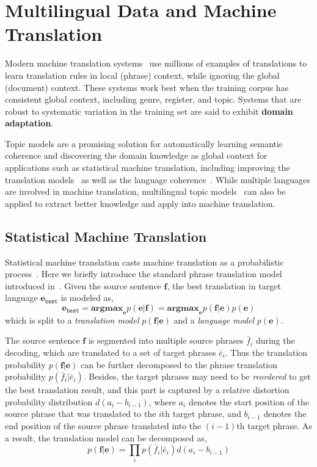 \chapter{Multilingual Data and Machine Translation}
\label{ch:mt}

Modern machine translation systems~\citep{koehn-09} use millions of examples of translations to learn translation rules in local (phrase) context, while ignoring the global (document) context. These systems work best when the training corpus has consistent global context, including genre, register, and topic. Systems that are robust to systematic variation in the training set are said to exhibit \textbf{domain adaptation}. 

Topic models are a promising solution for automatically learning semantic coherence and discovering the domain knowledge as global context for applications such as statistical machine translation, including improving the translation models~\citep{Eidelman-12,hu-14,zhao-06,xiao-12,xiong-13} as well as the language coherence~\citep{Bellegarda-04,wood-09}. 
While multiple languages are involved in machine translation, multilingual topic models~\citep{mimno-09,boyd-graber-10} can also be applied to extract better knowledge and apply into machine translation.

\section{Statistical Machine Translation}

Statistical machine translation casts machine translation as a probabilistic process~\citep{koehn-09}. Here we briefly introduce the standard phrase translation model introduced in~\citep{koehn-03}. Given the source sentence $\mathbf{f}$, the best translation in target language $\mathbf{e}_\texttt{best}$ is modeled as,
\begin{equation}
\mathbf{e}_\texttt{best} = \textbf{argmax}_\mathbf{e} p(\mathbf{e}|\mathbf{f}) = \textbf{argmax}_\mathbf{e} p(\mathbf{f}|\mathbf{e}) p (\mathbf{e})
\end{equation}
which is split to a \textit{translation model} $p(\mathbf{f}|\mathbf{e})$ and a \textit{language model} $p (\mathbf{e})$. 

The source sentence $\mathbf{f}$ is segmented into multiple source phrases $\bar{f}_i$ during the decoding, which are translated to a set of target phrases $\bar{e}_i$. Thus the translation probability $p(\mathbf{f}|\mathbf{e})$ can be further decomposed to the phrase translation probability $p(\bar{f}_i | \bar{e}_i)$. Besides, the target phrases may need to be \textit{reordered} to get the best translation result, and this part is captured by a relative distortion probability distribution $d(a_i - b_{i-1})$, where $a_i$ denotes the start position of the source phrase that was translated to the $i$th target phrase, and $b_{i-1}$ denotes the end position of the source phrase translated into the $(i-1)$th target phrase. As a result, the translation model can be decomposed as,
\begin{equation}
p(\mathbf{f}|\mathbf{e}) = \prod_{i} p(\bar{f}_i | \bar{e}_i) d(a_i - b_{i-1})
\end{equation}

